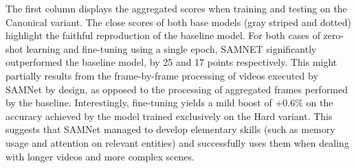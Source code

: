The first column displays the aggregated scores when training and testing on the Canonical variant.
The close scores of both base models (gray striped and dotted) highlight the faithful reproduction of the baseline model.
For both cases of zero-shot learning and fine-tuning using a single epoch, SAMNET significantly outperformed the baseline model, by 25 and 17 points respectively.
This might partially results from the frame-by-frame processing of videos executed by SAMNet by design, as opposed to the processing of aggregated frames performed by the baseline.
Interestingly, fine-tuning yields a mild boost of +0.6\% on the accuracy achieved by the model trained exclusively on the Hard variant.
This suggests that SAMNet managed to develop elementary skills (such as memory usage and attention on relevant entities) and successfully uses them when dealing with longer videos and more complex scenes.

